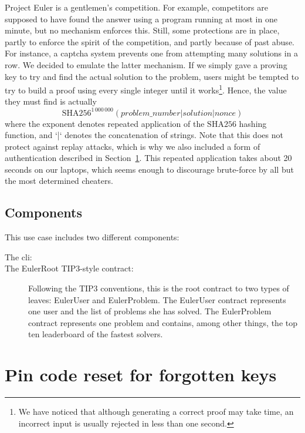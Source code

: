\documentclass[10pt,a4paper]{article}
\begin{document}
Project Euler is a gentlemen's competition. For example, competitors
are supposed to have found the answer using a program running at most
in one minute, but no mechanism enforces this. Still, some protections
are in place, partly to enforce the spirit of the competition, and
partly because of past abuse. For instance, a captcha system prevents
one from attempting many solutions in a row. We decided to emulate the
latter mechanism. If we simply gave a proving key to try and find the
actual solution to the problem, users might be tempted to try to build
a proof using every single integer until it works\footnote{We have
  noticed that although generating a correct proof may take time, an
  incorrect input is usually rejected in less than one
  second.}. Hence, the value they must find is actually
\[ \textrm{SHA256}^{1\,000\,000}\left(problem\_number | solution | nonce\right)\]
where the exponent denotes repeated application of the $\textrm{SHA256}$ hashing function, and `|` denotes the concatenation of strings. Note that this does not protect against replay attacks, which is why we also included a form of authentication described in Section~\ref{section_pincode}. This repeated application takes about 20 seconds on our laptops, which seems enough to discourage brute-force by all but the most determined cheaters.


\subsection{Components}
\label{subsec:euler_components}


This use case includes two different components:

\begin{description}
	\item[The cli:]
	\item[The EulerRoot TIP3-style contract:] Following the TIP3 conventions, this is the root contract to two types of leaves: EulerUser and EulerProblem. The EulerUser contract represents one user and the list of problems she has solved. The EulerProblem contract represents one problem and contains, among other things, the top ten leaderboard of the fastest solvers.
\end{description}

\section{Pin code reset for forgotten keys}
\label{section_pincode}
\end{document}
